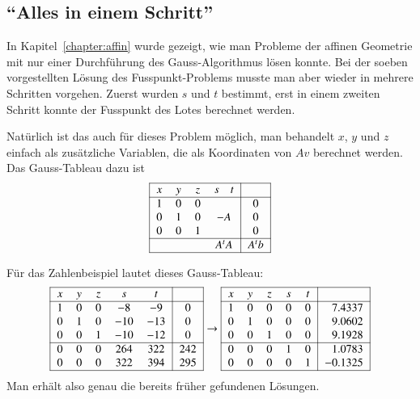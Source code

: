 %
%
\subsection{``Alles in einem Schritt''}
In Kapitel~\ref{chapter:affin} wurde gezeigt, wie man Probleme der
affinen Geometrie mit nur einer Durchführung des Gauss-Algorithmus
lösen konnte.
Bei der soeben vorgestellten Lösung des Fusspunkt-Problems
musste man aber wieder in mehrere Schritten vorgehen.
Zuerst wurden $s$ und $t$ bestimmt,
erst in einem zweiten Schritt konnte der Fusspunkt des Lotes
berechnet werden.

Natürlich ist das auch für dieses Problem möglich, man behandelt
$x$, $y$ und $z$ einfach als zusätzliche Variablen, die als Koordinaten
von $Av$ berechnet werden.
Das Gauss-Tableau dazu ist
\[
\begin{tabular}{|>{$}c<{$}>{$}c<{$}>{$}c<{$}>{$}c<{$}|>{$}c<{$}|}
\hline
x&y&z&s\quad t&\\
\hline
1&0&0&        &0\\
0&1&0&-A   &0\\
0&0&1&        &0\\
\hline
 & & &A^tA    &A^tb\\
\hline
\end{tabular}
\]
\begin{beispiel}
Für das Zahlenbeispiel lautet dieses Gauss-Tableau:
\[
\begin{tabular}{|>{$}c<{$}>{$}c<{$}>{$}c<{$}>{$}c<{$}>{$}c<{$}|>{$}c<{$}|}
\hline
x&y&z&s  &  t&\\
\hline
1&0&0& -8& -9&0\\
0&1&0&-10&-13&0\\
0&0&1&-10&-12&0\\
\hline
0&0&0&264&322&242\\
0&0&0&322&394&295\\
\hline
\end{tabular}
\rightarrow
\begin{tabular}{|>{$}c<{$}>{$}c<{$}>{$}c<{$}>{$}c<{$}>{$}c<{$}|>{$}r<{$}|}
\hline
x&y&z&s  &  t&\\
\hline
1&0&0&0&0&7.4337\\
0&1&0&0&0&9.0602\\
0&0&1&0&0&9.1928\\
\hline
0&0&0&1&0&1.0783\\
0&0&0&0&1&-0.1325\\
\hline
\end{tabular}
\]
Man erhält also genau die bereits früher gefundenen Lösungen.
\end{beispiel}

